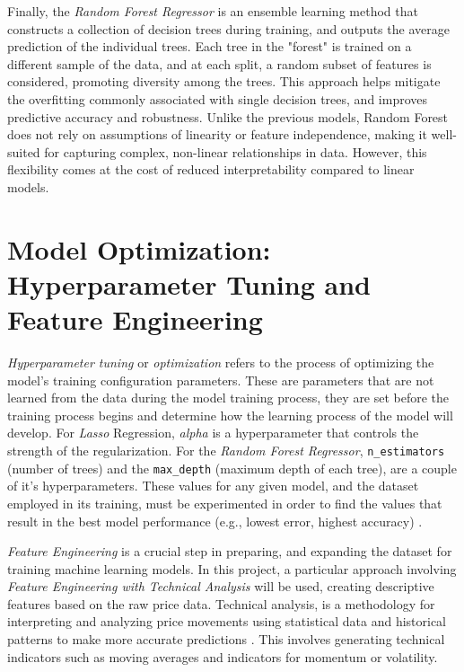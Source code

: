 \documentclass[12pt]{report} %
\begin{document}
Finally, the \textit{Random Forest Regressor} \cite{random_forest_regressor} is an ensemble learning method that constructs a collection of decision trees during training, and outputs the average prediction of the individual trees. Each tree in the "forest" is trained on a different sample of the data, and at each split, a random subset of features is considered, promoting diversity among the trees. This approach helps mitigate the overfitting commonly associated with single decision trees, and improves predictive accuracy and robustness. Unlike the previous models, Random Forest does not rely on assumptions of linearity or feature independence, making it well-suited for capturing complex, non-linear relationships in data. However, this flexibility comes at the cost of reduced interpretability compared to linear models.


\section{Model Optimization: Hyperparameter Tuning and Feature Engineering}

\textit{Hyperparameter tuning} or \textit{optimization} refers to the process of optimizing the model's training configuration parameters. These are parameters that are not learned from the data during the model training process, they are set before the training process begins and determine how the learning process of the model will develop. For \textit{Lasso} Regression, \textit{alpha} is a hyperparameter that controls the strength of the regularization. For the \textit{Random Forest Regressor}, \verb|n_estimators| (number of trees) and the \verb|max_depth| (maximum depth of each tree), are a couple of it's hyperparameters. These values for any given model, and the dataset employed in its training, must be experimented in order to find the values that result in the best model performance (e.g., lowest error, highest accuracy) \cite{ml-bishop}.



\textit{Feature Engineering} is a crucial step in preparing, and expanding the dataset for training machine learning models. In this project, a particular approach involving \textit{Feature Engineering with Technical Analysis} will be used, creating descriptive features based on the raw price data. Technical analysis, is a methodology for interpreting and analyzing price movements using statistical data and historical patterns to make more accurate predictions \cite{ta-academic}. This involves generating technical indicators such as moving averages and indicators for momentum or volatility.
\end{document}
